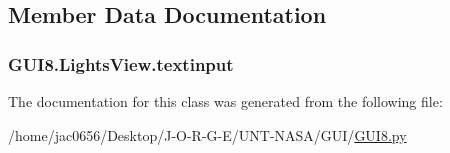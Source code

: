 \subsection{Member Data Documentation}
\subsubsection[{\texorpdfstring{textinput}{textinput}}]{\setlength{\rightskip}{0pt plus 5cm}G\+U\+I8.\+Lights\+View.\+textinput}\hypertarget{classGUI8_1_1LightsView_af42477d4f6dce0fdbef3142b50296a60}{}\label{classGUI8_1_1LightsView_af42477d4f6dce0fdbef3142b50296a60}


The documentation for this class was generated from the following file\+:\begin{DoxyCompactItemize}
\item 
/home/jac0656/\+Desktop/\+J-\/\+O-\/\+R-\/\+G-\/\+E/\+U\+N\+T-\/\+N\+A\+S\+A/\+G\+U\+I/\hyperlink{GUI_2GUI8_8py}{G\+U\+I8.\+py}\end{DoxyCompactItemize}
